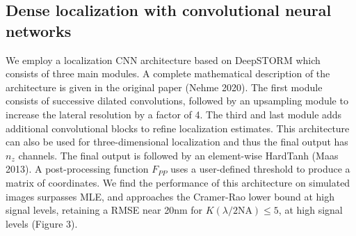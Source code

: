 \documentclass{ucetd}
\begin{document}
\subsection{Dense localization with convolutional neural networks}

We employ a localization CNN architecture based on DeepSTORM which consists of three main modules. A complete mathematical description of the architecture is given in the original paper (Nehme 2020). The first module consists of successive dilated convolutions, followed by an upsampling module to increase the lateral resolution by a factor of 4. The third and last module adds additional convolutional blocks to refine localization estimates. This architecture can also be used for three-dimensional localization and thus the final output has $n_{z}$ channels. The final output is followed by an element-wise HardTanh (Maas 2013). A post-processing function $F_{PP}$ uses a user-defined threshold to produce a matrix of coordinates. We find the performance of this architecture on simulated images surpasses MLE, and approaches the Cramer-Rao lower bound at high signal levels, retaining a RMSE near 20nm for $K(\lambda/2\mathrm{NA}) \leq 5$, at high signal levels (Figure 3). 
\end{document}
